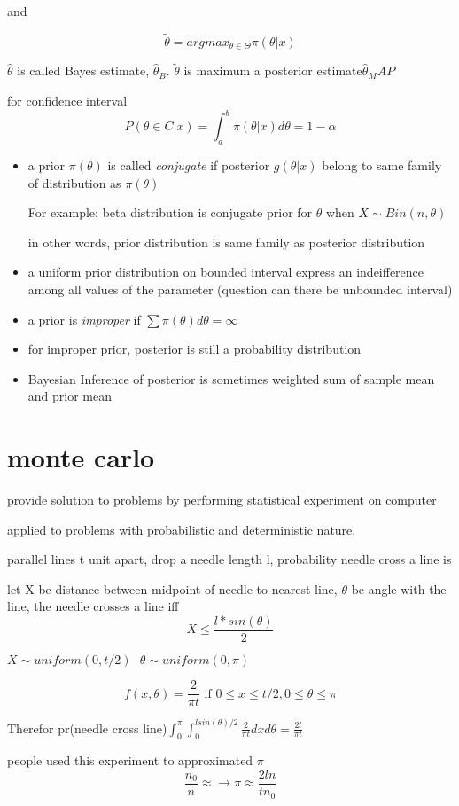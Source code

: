 \documentclass[10pt]{article}
\theoremstyle{break}
\begin{document}
and 

$$\tilde\theta=argmax_{\theta\in\Theta}\pi(\theta|x)$$

$\hat\theta$ is called Bayes estimate, $\hat\theta_B$. $\tilde \theta$ is maximum a posterior estimate$\hat\theta_MAP$

for confidence interval$$P(\theta\in C|x)=\int_a^b\pi(\theta|x)d\theta = 1-\alpha$$

\begin{itemize}
    \item a prior $\pi(\theta)$ is called \emph{conjugate} if posterior 
    $g(\theta|x)$ belong to same family of distribution as $\pi(\theta)$

    For example: beta distribution is conjugate prior for $\theta$ when $X\sim Bin(n,\theta)$

    in other words, prior distribution is same family as posterior distribution
    \item a uniform prior distribution on bounded interval express an indeifference among all values of the parameter (question can there be unbounded interval)
    \item a prior is \emph{improper} if $\sum \pi(\theta)d\theta=\infty$
    \item for improper prior, posterior is still a probability distribution

    \item Bayesian Inference of posterior is sometimes weighted sum of sample mean and prior mean 
    
\end{itemize}
\section{monte carlo}
provide solution to problems by performing statistical experiment on computer 

applied to problems with probabilistic and deterministic nature.

\begin{example}
    parallel lines t unit apart, drop a needle length l,
    probability needle cross a line is

    let X be distance between midpoint of needle to nearest line, $\theta$ be angle with the line,
    the needle crosses a line iff
    $$X\leq\frac{l*sin(\theta)}{2}$$

    $X\sim uniform(0,t/2)~~~\theta\sim uniform(0,\pi)$

    $$f(x,\theta)=\frac{2}{\pi t}\text{ if } 0\leq x \leq t/2, 0\leq\theta\leq\pi$$

    Therefor pr(needle cross line)$\int^\pi_0\int_0^{lsin(\theta)/2}
    \frac{2}{\pi t}dxd\theta=\frac{2l}{\pi t}$

    people used this experiment to approximated $\pi$ 
    $$\frac{n_0}{n}\approx \rightarrow \pi\approx\frac{2ln}{tn_0}$$
\end{example}
\end{document}
